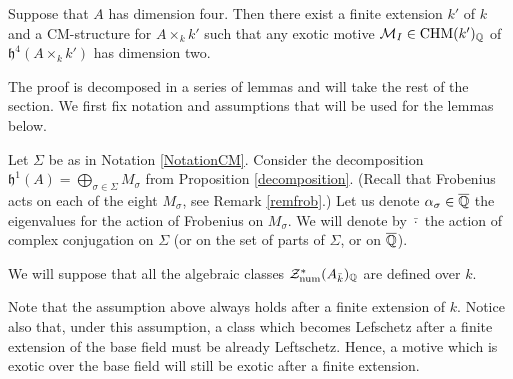 \begin{proposition}
\notready\label{exoticdim2}
Suppose that $A$ has dimension four. Then there exist a finite extension $k'$ of $k$ and a  CM-structure for $A\times_k k'$ such that any exotic motive $\mathcal{M}_I \in\mathrm{CHM} (k')_{\mathbb{Q}}$  of $\mathfrak{h}^{4}(A\times_k k')$ has dimension two.
\end{proposition}

The proof is decomposed in a series of lemmas and will take the rest of the section. We first fix notation and assumptions that will be used for the lemmas below.
\begin{notation}
\notready\label{notnotnot}
Let $\Sigma$ be as in Notation \ref{NotationCM}. Consider the decomposition $\mathfrak{h}^1(A) =\bigoplus_{\sigma \in \Sigma} M_\sigma$ from Proposition \ref{decomposition}. (Recall that  Frobenius acts on each of the eight $ M_\sigma$, see Remark \ref{remfrob}.) Let us denote  $\alpha_\sigma \in \overline{\mathbb{Q}}$ the  eigenvalues for the action of  Frobenius on  $ M_\sigma$. We will denote by $\bar{\cdot}$ the action of  complex conjugation on $ \Sigma$ (or on the set of parts of $ \Sigma$, or on $\overline{\mathbb{Q}}$).

\end{notation}
\begin{assumption}
\notready\label{assumassum}
We will suppose that all the algebraic classes $\mathcal{Z}^*_{\mathrm{num}} (A_{\bar{k}})_{\mathbb{Q}}$ are defined over $k$. \end{assumption}
\begin{remark}
\notready\label{assumptionlef}
Note that the assumption above always holds after a finite extension of $k$. Notice also that, under this assumption, a class which becomes Lefschetz after a finite extension of the base field must be already Leftschetz. Hence, a motive which is exotic over the base field will still be exotic after a finite extension.
\end{remark}

